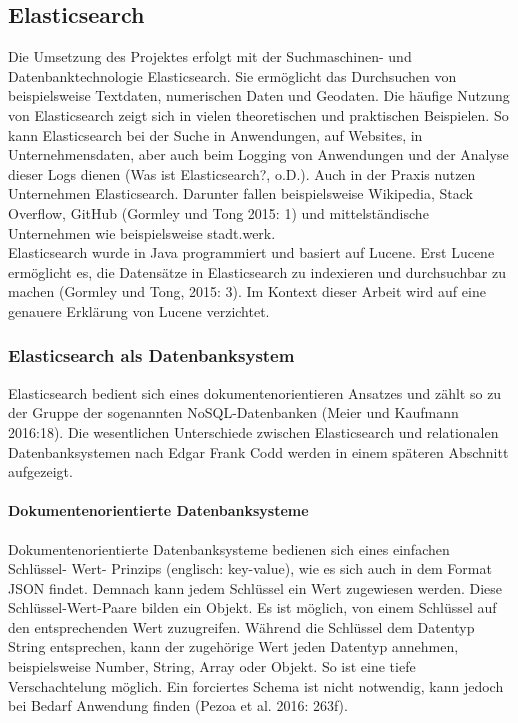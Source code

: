 \documentclass[a4paper]{scrartcl}
\begin{document}
\subsection{Elasticsearch}
Die Umsetzung des Projektes erfolgt mit der Suchmaschinen- und Datenbanktechnologie Elasticsearch. Sie ermöglicht das Durchsuchen von beispielsweise Textdaten, numerischen Daten und Geodaten. Die häufige Nutzung von Elasticsearch zeigt sich in vielen theoretischen und praktischen Beispielen. So kann Elasticsearch bei der Suche in Anwendungen, auf Websites, in Unternehmensdaten, aber auch beim Logging von Anwendungen und der Analyse dieser Logs dienen (Was ist Elasticsearch?, o.D.). Auch in der Praxis nutzen Unternehmen Elasticsearch. Darunter fallen beispielsweise Wikipedia, Stack Overflow, GitHub (Gormley und Tong 2015: 1) und mittelständische Unternehmen wie beispielsweise stadt.werk. \\
Elasticsearch wurde in Java programmiert und basiert auf Lucene. Erst Lucene ermöglicht es, die Datensätze in Elasticsearch zu indexieren und durchsuchbar zu machen (Gormley und Tong, 2015: 3). Im Kontext dieser Arbeit wird auf eine genauere Erklärung von Lucene verzichtet.


\subsubsection{Elasticsearch als Datenbanksystem}
Elasticsearch bedient sich eines dokumentenorientieren Ansatzes und zählt so zu der Gruppe der sogenannten NoSQL-Datenbanken (Meier und Kaufmann 2016:18). Die wesentlichen Unterschiede zwischen Elasticsearch und relationalen Datenbanksystemen nach Edgar Frank Codd werden in einem späteren Abschnitt aufgezeigt. 

\paragraph{Dokumentenorientierte Datenbanksysteme}
Dokumentenorientierte Datenbanksysteme bedienen sich eines einfachen Schlüssel- Wert- Prinzips (englisch: key-value), wie es sich auch in dem Format JSON findet. Demnach kann jedem Schlüssel ein Wert zugewiesen werden. Diese Schlüssel-Wert-Paare bilden ein Objekt. Es ist möglich, von einem Schlüssel auf den entsprechenden Wert zuzugreifen. Während die Schlüssel dem Datentyp String entsprechen, kann der zugehörige Wert jeden Datentyp annehmen, beispielsweise Number, String, Array oder Objekt. So ist eine tiefe Verschachtelung möglich. Ein forciertes Schema ist nicht notwendig, kann jedoch bei Bedarf Anwendung finden (Pezoa et al. 2016: 263f).
\end{document}
